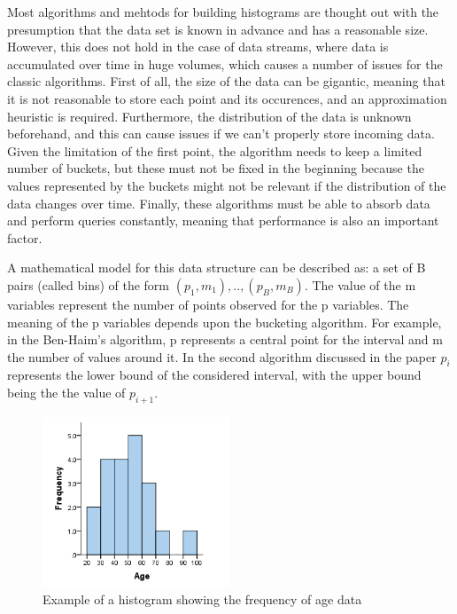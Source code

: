 \documentclass[12pt]{article}
\begin{document}
	Most algorithms and mehtods for building histograms are thought out with the presumption 
	that the data set is known in advance and has a reasonable size. 
	However, this does not hold in the case of data 
	streams, where data is accumulated over time in huge volumes, 
	which causes a number of issues for the classic algorithms. First of all, 
	the size of the data can be gigantic, meaning that it is not reasonable to 
	store each point and its occurences, and an approximation heuristic is required.
	Furthermore, the distribution of the data is unknown beforehand, and this 
	can cause issues if we can't properly store incoming data. Given the limitation
	of the first point, the algorithm needs to keep a limited number of buckets, but these 
	must not be fixed in the beginning because the values represented by the buckets might not
	be relevant if the distribution of the data changes over time. Finally, these algorithms 
	must be able to absorb data and perform queries constantly, meaning that performance is 
	also an important factor.

	A mathematical model for this data structure can be described as: a set of B pairs (called bins)
	of the form ${(p_1, m_1), .., (p_B, m_B)}$. The value of the m variables represent the number 
	of points observed for the p variables. The meaning of the p variables depends upon the bucketing 
	algorithm. For example, in the Ben-Haim's algorithm\cite{Ben-Haim:2010:SPD:1756006.1756034},
	p represents a central point for the interval and m the number of values around it. In the 
	second algorithm discussed in the paper $p_i$ represents the lower bound of the considered interval,
	with the upper bound being the the value of $p_{i+1}$.
	
	\begin{figure}[H]
		\label{histogram}
		\caption{Example of a histogram showing the frequency of age data\cite{HistogramExample}}
		\centering
		  \includegraphics[width=0.5\textwidth]{histogram.png}
	\end{figure}
\end{document}

